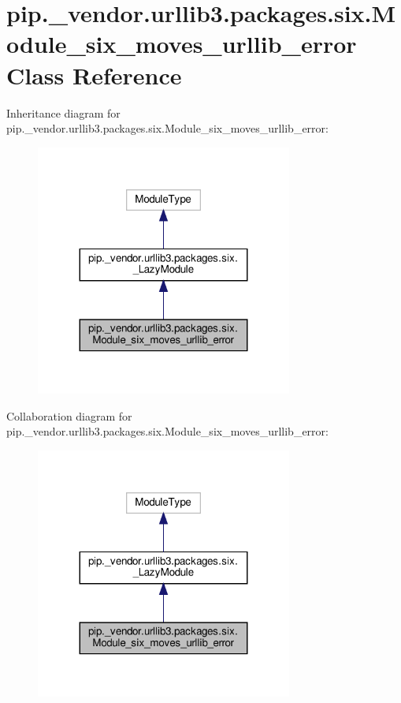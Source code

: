 \hypertarget{classpip_1_1__vendor_1_1urllib3_1_1packages_1_1six_1_1Module__six__moves__urllib__error}{}\section{pip.\+\_\+vendor.\+urllib3.\+packages.\+six.\+Module\+\_\+six\+\_\+moves\+\_\+urllib\+\_\+error Class Reference}
\label{classpip_1_1__vendor_1_1urllib3_1_1packages_1_1six_1_1Module__six__moves__urllib__error}


Inheritance diagram for pip.\+\_\+vendor.\+urllib3.\+packages.\+six.\+Module\+\_\+six\+\_\+moves\+\_\+urllib\+\_\+error\+:
\nopagebreak
\begin{figure}[H]
\begin{center}
\leavevmode
\includegraphics[width=239pt]{classpip_1_1__vendor_1_1urllib3_1_1packages_1_1six_1_1Module__six__moves__urllib__error__inherit__graph}
\end{center}
\end{figure}


Collaboration diagram for pip.\+\_\+vendor.\+urllib3.\+packages.\+six.\+Module\+\_\+six\+\_\+moves\+\_\+urllib\+\_\+error\+:
\nopagebreak
\begin{figure}[H]
\begin{center}
\leavevmode
\includegraphics[width=239pt]{classpip_1_1__vendor_1_1urllib3_1_1packages_1_1six_1_1Module__six__moves__urllib__error__coll__graph}
\end{center}
\end{figure}
